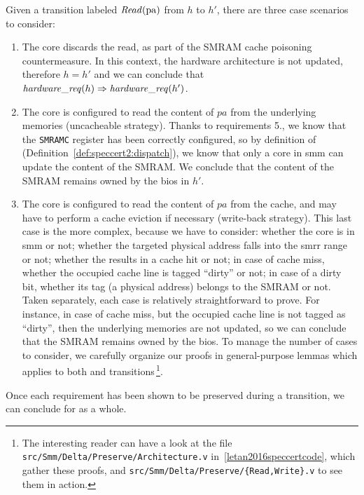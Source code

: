 Given a transition labeled \( \mathit{Read}(\mathrm{pa}) \) from \( h \) to \( h' \),
there are three case scenarios to consider:
%
\begin{enumerate}
\item The core discards the read, as part of the SMRAM cache poisoning
  countermeasure.
  In this context, the hardware architecture is not updated, therefore
  \( h = h' \) and we can conclude that
  \( \mathit{hardware\_req}(h) \Rightarrow \mathit{hardware\_req}(h') \).
\item The core is configured to read the content of \( pa \) from the underlying
  memories (uncacheable strategy).
  Thanks to requirements 5., we know that the \texttt{SMRAMC} register has been
  correctly configured, so by definition of 
  (Definition~\ref{def:speccert2:dispatch}), we know that only a core in
  \ac{smm} can update the content of the SMRAM.
  We conclude that the content of the SMRAM remains owned by the \ac{bios} in
  \( h' \).
\item The core is configured to read the content of \( pa \) from the cache, and
  may have to perform a cache eviction if necessary (write-back strategy).
  This last case is the more complex, because we have to consider:
  whether the core is in \ac{smm} or not;
  whether the targeted physical address falls into the \ac{smrr} range or not;
  whether the \IO results in a cache hit or not;
  in case of cache miss, whether the occupied cache line is tagged ``dirty'' or
  not;
  in case of a dirty bit, whether its tag (a physical address) belongs to the
  SMRAM or not.
  Taken separately, each case is relatively straightforward to prove.
  For instance, in case of cache miss, but the occupied cache line is not tagged
  as ``dirty'', then the underlying memories are not updated, so we can conclude
  that the SMRAM remains owned by the \ac{bios}.
  To manage the number of cases to consider, we carefully organize our proofs in
  general-purpose lemmas which applies to both  and 
  transitions\,\footnote{The interesting reader can have a look at the file
    \texttt{src/Smm/Delta/Preserve/Architecture.v}
    in~\ref{letan2016speccertcode}, which gather these proofs, and
    \texttt{src/Smm/Delta/Preserve/\{Read,Write\}.v} to see them in action.}. 
\end{enumerate}
%
Once each requirement has been shown to be preserved during a transition, we can
conclude for  as a whole.

